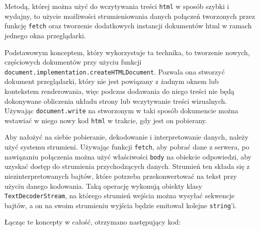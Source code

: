 \documentclass[licencjacka]{pracadypl}
\begin{document}
Metodą, której można użyć do wczytywania treści \texttt{html} w sposób szybki i wydajny, to użycie możliwości strumieniowania danych połączeń tworzonych przez funkcję \texttt{fetch} oraz tworzenie dodatkowych instancji dokumentów html w ramach jednego okna przeglądarki.

Podstawowym konceptem, który wykorzystuje ta technika, to tworzenie nowych, częściowych dokumentów przy użyciu funkcji \texttt{document.implementation.createHTMLDocument}. Pozwala ona stworzyć dokument przeglądarki, który nie jest powiązany z żadnym oknem lub kontekstem renderowania, więc podczas dodawania do niego treści nie będą dokonywane obliczenia układu strony lub wczytywanie treści wizualnych. Używając \texttt{document.write} na stworzonym w taki sposób dokumencie można wstawiać w niego nowy kod \texttt{html} w trakcie, gdy jest on pobierany.

Aby nałożyć na siebie pobieranie, dekodowanie i interpretowanie danych, należy użyć systemu strumieni. Używając funkcji \texttt{fetch}, aby pobrać dane z serwera, po nawiązaniu połączenia można użyć właściwości \texttt{body} na obiekcie odpowiedzi, aby uzyskać dostęp do strumienia przychodzących danych. Strumień ten składa się z niezinterpretowanych bajtów, które potrzeba przekonwertować na tekst przy użyciu danego kodowania. Taką operację wykonują obiekty klasy \texttt{TextDecoderStream}, na którego strumień wejścia można wysyłać sekwencje bajtów, a on na swoim strumieniu wyjścia będzie emitował kolejne \texttt{string}'i. 

Łącząc te koncepty w całość, otrzymano następujący kod:
\end{document}

